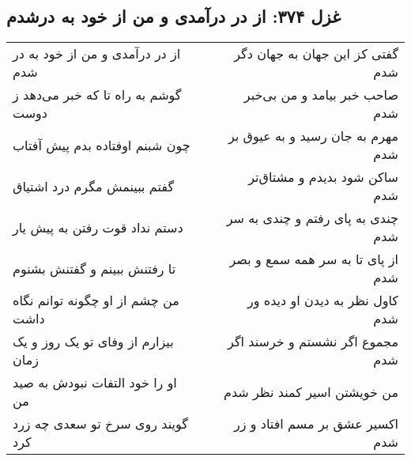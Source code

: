 \begin{center}
\section*{غزل ۳۷۴: از در درآمدی و من از خود به درشدم}
\label{sec:374}
\begin{longtable}{l p{0.5cm} r}
از در درآمدی و من از خود به در شدم
&&
گفتی کز این جهان به جهان دگر شدم
\\
گوشم به راه تا که خبر می‌دهد ز دوست
&&
صاحب خبر بیامد و من بی‌خبر شدم
\\
چون شبنم اوفتاده بدم پیش آفتاب
&&
مهرم به جان رسید و به عیوق بر شدم
\\
گفتم ببینمش مگرم درد اشتیاق
&&
ساکن شود بدیدم و مشتاق‌تر شدم
\\
دستم نداد قوت رفتن به پیش یار
&&
چندی به پای رفتم و چندی به سر شدم
\\
تا رفتنش ببینم و گفتنش بشنوم
&&
از پای تا به سر همه سمع و بصر شدم
\\
من چشم از او چگونه توانم نگاه داشت
&&
کاول نظر به دیدن او دیده ور شدم
\\
بیزارم از وفای تو یک روز و یک زمان
&&
مجموع اگر نشستم و خرسند اگر شدم
\\
او را خود التفات نبودش به صید من
&&
من خویشتن اسیر کمند نظر شدم
\\
گویند روی سرخ تو سعدی چه زرد کرد
&&
اکسیر عشق بر مسم افتاد و زر شدم
\\
\end{longtable}
\end{center}
